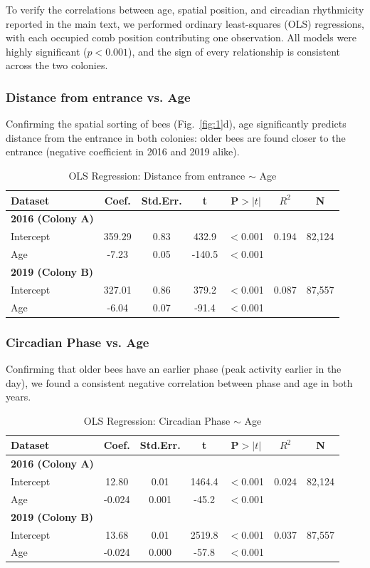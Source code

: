 \documentclass{article}
\newcommand{\added}[1]{{\color{blue}#1}}
\newcommand{\added}[1]{#1}
\begin{document}
\added{
To verify the correlations between age, spatial position, and circadian rhythmicity reported in the main text, we performed ordinary least-squares (OLS) regressions, with each occupied comb position contributing one observation. All models were highly significant ($p < 0.001$), and the sign of every relationship is consistent across the two colonies.

\subsubsection*{Distance from entrance vs. Age}
Confirming the spatial sorting of bees (Fig.~\ref{fig:1}d), age significantly predicts distance from the entrance in both colonies: older bees are found closer to the entrance (negative coefficient in 2016 and 2019 alike).

\begin{table}[h]
\centering
\caption{OLS Regression: Distance from entrance $\sim$ Age}
\label{tab:dist_age}
\begin{tabular}{lcccccc}
\toprule
Dataset & Coef. & Std.Err. & t & P$>|t|$ & $R^2$ & N \\
\midrule
\textbf{2016 (Colony A)} & & & & & & \\
Intercept & 359.29 & 0.83 & 432.9 & $<$0.001 & 0.194 & 82,124 \\
Age & -7.23 & 0.05 & -140.5 & $<$0.001 & & \\
\midrule
\textbf{2019 (Colony B)} & & & & & & \\
Intercept & 327.01 & 0.86 & 379.2 & $<$0.001 & 0.087 & 87,557 \\
Age & -6.04 & 0.07 & -91.4 & $<$0.001 & & \\
\bottomrule
\end{tabular}
\end{table}

\subsubsection*{Circadian Phase vs. Age}
Confirming that older bees have an earlier phase (peak activity earlier in the day), we found a consistent negative correlation between phase and age in both years.

\begin{table}[h]
\centering
\caption{OLS Regression: Circadian Phase $\sim$ Age}
\label{tab:phase_age}
\begin{tabular}{lcccccc}
\toprule
Dataset & Coef. & Std.Err. & t & P$>|t|$ & $R^2$ & N \\
\midrule
\textbf{2016 (Colony A)} & & & & & & \\
Intercept & 12.80 & 0.01 & 1464.4 & $<$0.001 & 0.024 & 82,124 \\
Age & -0.024 & 0.001 & -45.2 & $<$0.001 & & \\
\midrule
\textbf{2019 (Colony B)} & & & & & & \\
Intercept & 13.68 & 0.01 & 2519.8 & $<$0.001 & 0.037 & 87,557 \\
Age & -0.024 & 0.000 & -57.8 & $<$0.001 & & \\
\bottomrule
\end{tabular}
\end{table}

}
\end{document}
